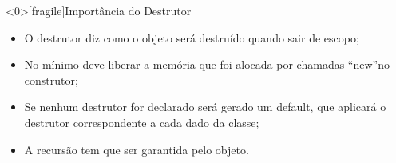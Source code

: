 \documentclass[12pt,table,xcolor={dvipsnames}]{beamer}
\begin{document}
\begin{frame}<0>[fragile]{Importância do Destrutor}
\begin{itemize}
\item O destrutor diz como o objeto será destruído quando sair de escopo;
\item No mínimo deve liberar a memória que foi alocada por chamadas “new”no construtor;
\item Se nenhum destrutor for declarado será gerado um default, que aplicará o destrutor correspondente a cada dado da classe;
\item A recursão tem que ser garantida pelo objeto.
\end{itemize}
\end{frame}
\end{document}
